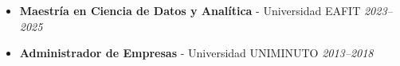 \begin{itemize}[leftmargin=*]
  \item \textbf{Maestría en Ciencia de Datos y Analítica} - Universidad EAFIT \hfill \textit{2023–2025}
  \item \textbf{Administrador de Empresas} - Universidad UNIMINUTO \hfill \textit{2013–2018}
\end{itemize}
